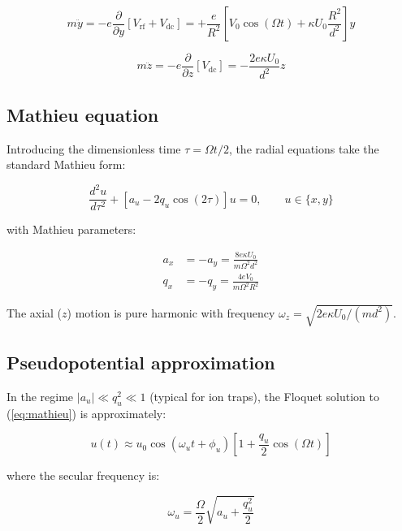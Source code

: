\documentclass[11pt,a4paper]{article}
\begin{document}
\begin{equation}
m\ddot{y} = -e\frac{\partial}{\partial y}[V_{\text{rf}} + V_{\text{dc}}]
           = +\frac{e}{R^2}\left[V_0\cos(\Omega t) + \kappa U_0\frac{R^2}{d^2}\right]y
\label{eq:eom_y}
\end{equation}

\begin{equation}
m\ddot{z} = -e\frac{\partial}{\partial z}[V_{\text{dc}}]
           = -\frac{2e\kappa U_0}{d^2}z
\label{eq:eom_z}
\end{equation}

\subsection{Mathieu equation}

Introducing the dimensionless time $\tau = \Omega t/2$, the radial equations
take the standard Mathieu form:

\begin{equation}
\frac{d^2 u}{d\tau^2} + \left[a_u - 2q_u\cos(2\tau)\right]u = 0, \qquad u \in \{x,y\}
\label{eq:mathieu}
\end{equation}

with Mathieu parameters:

\begin{align}
a_x &= -a_y = \frac{8e\kappa U_0}{m\Omega^2 d^2} \\
q_x &= -q_y = \frac{4eV_0}{m\Omega^2 R^2}
\label{eq:mathieu_params}
\end{align}

The axial ($z$) motion is pure harmonic with frequency $\omega_z = \sqrt{2e\kappa U_0/(md^2)}$.

\subsection{Pseudopotential approximation}

In the regime $|a_u| \ll q_u^2 \ll 1$ (typical for ion traps), the Floquet
solution to (\ref{eq:mathieu}) is approximately:

\begin{equation}
u(t) \approx u_0\cos(\omega_u t + \phi_u)\left[1 + \frac{q_u}{2}\cos(\Omega t)\right]
\label{eq:pseudopotential}
\end{equation}

where the secular frequency is:

\begin{equation}
\omega_u = \frac{\Omega}{2}\sqrt{a_u + \frac{q_u^2}{2}}
\label{eq:secular_freq}
\end{equation}
\end{document}
